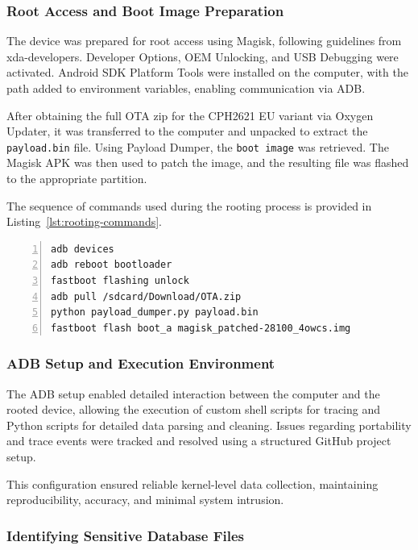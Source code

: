\documentclass[a4paper,12pt]{report}
\begin{document}
\subsubsection{Root Access and Boot Image Preparation}

The device was prepared for root access using Magisk, following guidelines from xda-developers. Developer Options, OEM Unlocking, and USB Debugging were activated. Android SDK Platform Tools were installed on the computer, with the path added to environment variables, enabling communication via ADB.

After obtaining the full OTA zip for the CPH2621 EU variant via Oxygen Updater, it was transferred to the computer and unpacked to extract the \texttt{payload.bin} file. Using Payload Dumper, the \texttt{boot image} was retrieved. The Magisk APK was then used to patch the image, and the resulting file was flashed to the appropriate partition.

The sequence of commands used during the rooting process is provided in Listing~\ref{lst:rooting-commands}.

\begin{lstlisting}[language=bash,caption={Rooting commands for device setup},label={lst:rooting-commands},numbers=left]
adb devices
adb reboot bootloader
fastboot flashing unlock
adb pull /sdcard/Download/OTA.zip
python payload_dumper.py payload.bin
fastboot flash boot_a magisk_patched-28100_4owcs.img
\end{lstlisting}

\subsubsection{ADB Setup and Execution Environment}

The ADB setup enabled detailed interaction between the computer and the rooted device, allowing the execution of custom shell scripts for tracing and Python scripts for detailed data parsing and cleaning. Issues regarding portability and trace events were tracked and resolved using a structured GitHub project setup.

This configuration ensured reliable kernel-level data collection, maintaining reproducibility, accuracy, and minimal system intrusion.

\subsubsection{Identifying Sensitive Database Files}
\end{document}
